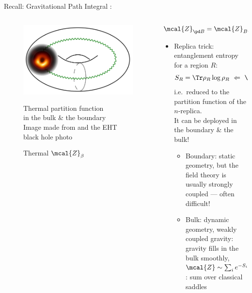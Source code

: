 \documentclass[aspectratio=169,10pt
	,noamsthm
]{beamer}
\begin{document}
\begin{frame}{Recall: Gravitational Path Integral}{%
	\textcite{Lewkowycz:2013nqa}:\,%
}
	\begin{columns}
	\begin{column}{.3\textwidth}
		\begin{figure}[!h]
		\centering
		\includegraphics[width=\linewidth]{img/blackhole_donut.png}
		\caption{Thermal $\mcal{Z}_\beta$}
		
		\footnotesize
		Thermal partition function \\ in the bulk \& the boundary
		\\[2ex]
		\scriptsize
		Image made from \textcite{Benjamin:2020mfz} and the EHT black hole photo
		\end{figure}
	\end{column}
	\begin{column}{.7\textwidth}
		\begin{equation}
			\mcal{Z}_{\pd B} = \mcal{Z}_{B\textit{ulk}}
		\end{equation}
		\vspace{-1.2\baselineskip}
		\begin{itemize}
		\item Replica trick: entanglement entropy for a region $R$:
		\begin{equation}
			S_R
			= \Tr
				\rho_R \log \rho_R
			\ \Leftarrow\ %
			\Tr \rho_R^n \equiv \mcal{Z}_n
		\end{equation}
		i.e.~reduced to the partition function of the $n$-replica.\\
		It can be deployed in the boundary \& the bulk!
			\begin{itemize}
			\item Boundary: static geometry, but the field theory is usually strongly coupled --- often difficult!
		\pause
			\item Bulk: dynamic geometry, weakly coupled gravity:\\
			gravity fills in the bulk smoothly, \\
			$
				\mcal{Z} \sim \sum_i e^{-S_i[g_{\mu\nu}]}
			$: sum over classical saddles
			\end{itemize}
		\end{itemize}
	\end{column}
	\end{columns}
\end{frame}
\end{document}
